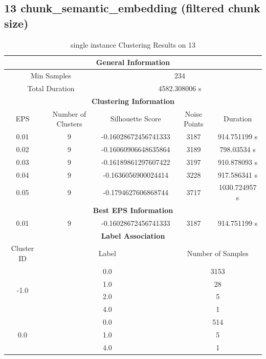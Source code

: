 \subsection{13 chunk\_semantic\_embedding (filtered chunk size)}

\begin{longtable}{|c|c|c|c|c|}
\caption{single instance Clustering Results on 13} \label{tab:13_single_instance_clustering_results}\\
\hline
\multicolumn{5}{|c|}{\textbf{General Information}} \\
\hline
\multicolumn{2}{|c|}{Min Samples} & \multicolumn{3}{c|}{234} \\
\multicolumn{2}{|c|}{Total Duration} & \multicolumn{3}{c|}{4582.308006 s} \\
\hline
\multicolumn{5}{|c|}{\textbf{Clustering Information}} \\
\hline
EPS & Number of Clusters & Silhouette Score & Noise Points & Duration \\
0.01 & 9 & -0.16028672456741333 & 3187 & 914.751199 s\\
0.02 & 9 & -0.16060906648635864 & 3189 & 798.03534 s\\
0.03 & 9 & -0.16189861297607422 & 3197 & 910.878093 s\\
0.04 & 9 & -0.1636056900024414 & 3228 & 917.586341 s\\
0.05 & 9 & -0.1794627606868744 & 3717 & 1030.724957 s\\
\hline
\multicolumn{5}{|c|}{\textbf{Best EPS Information}} \\
\hline
0.01 & 9 & -0.16028672456741333 & 3187 & 914.751199 s\\
\hline
\multicolumn{5}{|c|}{\textbf{Label Association}} \\
\hline
Cluster ID & \multicolumn{2}{c|}{Label} & \multicolumn{2}{c|}{Number of Samples} \\
\hline
\multirow{4}{*}{-1.0} & \multicolumn{2}{c|}{0.0} & \multicolumn{2}{c|}{3153} \\
& \multicolumn{2}{c|}{1.0} & \multicolumn{2}{c|}{28} \\
& \multicolumn{2}{c|}{2.0} & \multicolumn{2}{c|}{5} \\
& \multicolumn{2}{c|}{4.0} & \multicolumn{2}{c|}{1} \\
\hline
\multirow{3}{*}{0.0} & \multicolumn{2}{c|}{0.0} & \multicolumn{2}{c|}{514} \\
& \multicolumn{2}{c|}{1.0} & \multicolumn{2}{c|}{5} \\
& \multicolumn{2}{c|}{4.0} & \multicolumn{2}{c|}{1} \\

\end{longtable}
